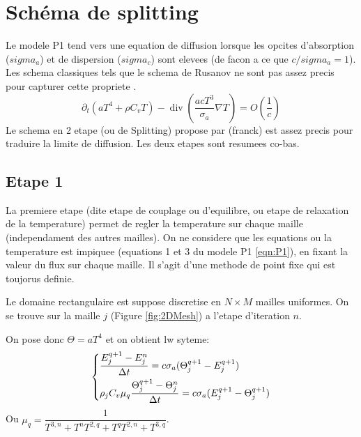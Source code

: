 
\section{Schéma de splitting}

Le modele P1 tend vers une equation de diffusion lorsque les opcites d'absorption ($sigma_a$) et de dispersion ($sigma_c$) sont elevees (de facon a ce que $c/sigma_a = 1$). Les schema classiques tels que le schema de Rusanov ne sont pas assez precis pour capturer cette propriete \parencite{Reference4}. 
\begin{equation}
\partial_t \left( aT^4 + \rho C_v T \right) - \operatorname{div} \left(\frac{acT^3}{\sigma_a} \nabla T \right) = O\left( \frac{1}{c} \right)
\end{equation}
Le schema en 2 etape (ou de Splitting) propose par (franck) est assez precis pour traduire la limite de diffusion. Les deux etapes sont resumees co-bas.


\subsection{Etape 1}
La premiere etape (dite etape de couplage ou d'equilibre, ou etape de relaxation de la temperature) permet de regler la temperature sur chaque maille (independament des autres mailles). On ne considere que les equations ou la temperature est impiquee (equations 1 et 3 du modele P1 \ref{eqn:P1}), en fixant la valeur du flux sur chaque maille. Il s'agit d'une methode de point fixe qui est toujorus definie. \parencite{Reference2}

Le domaine rectangulaire est suppose discretise en $N \times M$ mailles uniformes. On se trouve sur la maille $j$ (Figure \ref{fig:2DMesh}) a l'etape d'iteration $n$.

On pose donc $\Theta = aT^4$ et on obtient lw syteme:
\begingroup
\normalsize
\begin{equation*}
    \begin{dcases}
     \dfrac{E_j^{q+1} - E_j^{n}}{\Delta t} = c \sigma_a ( \Theta_j^{q+1} - E_j^{q+1}) \\
     \rho_j C_v \mu_q \dfrac{\Theta_j^{q+1} - \Theta_j^{n}}{\Delta t} = c \sigma_a (E_j^{q+1} - \Theta_j^{q+1}) 
    \end{dcases}
\end{equation*}
\endgroup
Ou $\mu_q = \dfrac{1}{T^{3,n} + T^{n}T^{2,q} + T^{q}T^{2,n} + T^{3,q}}$.

